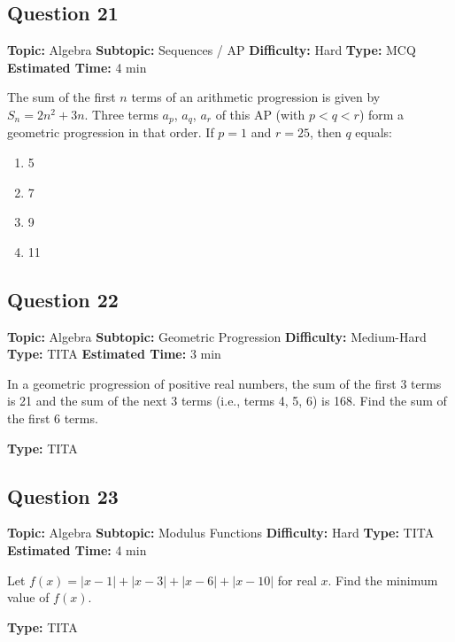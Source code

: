 \documentclass[11pt]{article}
\begin{document}
\subsection*{Question 21}
\textbf{Topic:} Algebra \quad \textbf{Subtopic:} Sequences / AP \quad \textbf{Difficulty:} Hard \quad \textbf{Type:} MCQ \quad \textbf{Estimated Time:} 4 min

\begin{tcolorbox}
The sum of the first $n$ terms of an arithmetic progression is given by $S_n = 2n^2 + 3n$. Three terms $a_p$, $a_q$, $a_r$ of this AP (with $p < q < r$) form a geometric progression in that order. If $p = 1$ and $r = 25$, then $q$ equals:
\end{tcolorbox}
\begin{enumerate}[label=(\Alph*)]
\item 5
\item 7
\item 9
\item 11
\end{enumerate}

\subsection*{Question 22}
\textbf{Topic:} Algebra \quad \textbf{Subtopic:} Geometric Progression \quad \textbf{Difficulty:} Medium-Hard \quad \textbf{Type:} TITA \quad \textbf{Estimated Time:} 3 min

\begin{tcolorbox}
In a geometric progression of positive real numbers, the sum of the first 3 terms is 21 and the sum of the next 3 terms (i.e., terms 4, 5, 6) is 168. Find the sum of the first 6 terms.
\end{tcolorbox}
\textbf{Type:} TITA

\subsection*{Question 23}
\textbf{Topic:} Algebra \quad \textbf{Subtopic:} Modulus Functions \quad \textbf{Difficulty:} Hard \quad \textbf{Type:} TITA \quad \textbf{Estimated Time:} 4 min

\begin{tcolorbox}
Let $f(x) = |x - 1| + |x - 3| + |x - 6| + |x - 10|$ for real $x$. Find the minimum value of $f(x)$.
\end{tcolorbox}
\textbf{Type:} TITA
\end{document}
